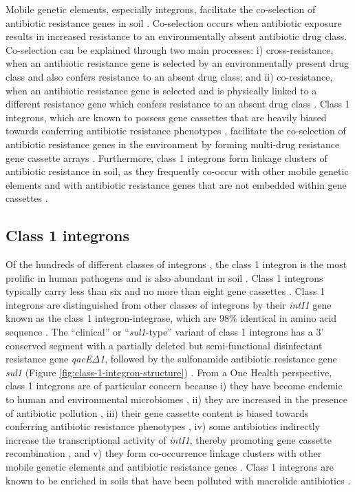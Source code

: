Mobile genetic elements, especially integrons, facilitate the co-selection of antibiotic resistance genes in soil \parencite{Pal.2015}.
Co-selection occurs when antibiotic exposure results in increased resistance to an environmentally absent antibiotic drug class.
Co-selection can be explained through two main processes: i) cross-resistance, when an antibiotic resistance gene is selected by an environmentally present drug class and also confers resistance to an absent drug class; and ii) co-resistance, when an antibiotic resistance gene is selected and is physically linked to a different resistance gene which confers resistance to an absent drug class \parencite{Wales.2015}.
Class 1 integrons, which are known to possess gene cassettes that are heavily biased towards conferring antibiotic resistance phenotypes \parencite{Ghaly.2020, Yang.2021}, facilitate the co-selection of antibiotic resistance genes in the environment by forming multi-drug resistance gene cassette arrays \parencite{Naas.2001}.
Furthermore, class 1 integrons form linkage clusters of antibiotic resistance in soil, as they frequently co-occur with other mobile genetic elements and with antibiotic resistance genes that are not embedded within gene cassettes \parencite{Johnson.2016, Pal.2015}.

\subsection{Class 1 integrons}

Of the hundreds of different classes of integrons \parencite{Abella.2015}, the class 1 integron is the most prolific in human pathogens and is also abundant in soil \parencite{Dawes.2010, RuizMartinez.2011, Gillings.2018}.
Class 1 integrons typically carry less than six and no more than eight gene cassettes \parencite{Gillings.2014, Naas.2001}.
Class 1 integrons are distinguished from other classes of integrons by their \textit{intI1} gene known as the class 1 integron-integrase, which are 98\% identical in amino acid sequence \parencite{Roy.2021}.
The “clinical” or “\textit{sul1}-type” variant of class 1 integrons has a 3’ conserved segment with a partially deleted but semi-functional disinfectant resistance gene \textit{qacE${\Delta}$1}, followed by the sulfonamide antibiotic resistance gene \textit{sul1} (Figure \ref{fig:class-1-integron-structure}) \parencite{Partridge.2018}.
From a One Health perspective, class 1 integrons are of particular concern because
i) they have become endemic to human and environmental microbiomes \parencite{Gillings.2017},
ii) they are increased in the presence of antibiotic pollution \parencite{Gillings.2017, Wright.2008, Stalder.2014},
iii) their gene cassette content is biased towards conferring antibiotic resistance phenotypes \parencite{Yang.2021},
iv) some antibiotics indirectly increase the transcriptional activity of \textit{intI1}, thereby promoting gene cassette recombination \parencite{Baharoglu.2010}, and
v) they form co-occurrence linkage clusters with other mobile genetic elements and antibiotic resistance genes \parencite{Pal.2015}.
Class 1 integrons are known to be enriched in soils that have been polluted with macrolide antibiotics \parencite{Lau.2020}.

